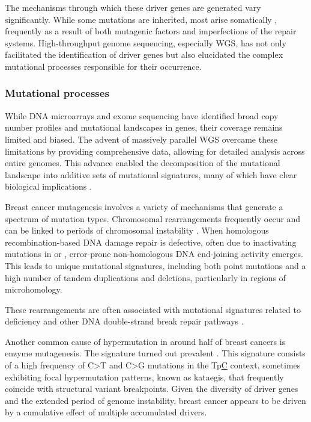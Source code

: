 The mechanisms through which these driver genes are generated vary significantly. While some mutations are inherited, most arise somatically , frequently as a result of both mutagenic factors and imperfections of the repair systems. High-throughput genome sequencing, especially \ac{WGS}, has not only facilitated the identification of driver genes but also elucidated the complex mutational processes responsible for their occurrence.

\subsubsection*{Mutational processes}

While DNA microarrays and exome sequencing have identified broad copy number profiles and mutational landscapes in genes, their coverage remains limited and biased. The advent of massively parallel \ac{WGS} overcame these limitations by providing comprehensive data, allowing for detailed analysis across entire genomes. This advance enabled the decomposition of the mutational landscape into additive sets of mutational signatures, many of which have clear biological implications \parencite{Nik-Zainal2012-vo}. 

Breast cancer mutagenesis involves a variety of mechanisms that generate a spectrum of mutation types. Chromosomal rearrangements frequently occur and can be linked to periods of chromosomal instability \parencite{Curtis2012-hu, Gerstung2020-sg, Nik-Zainal2012-vo}. When homologous recombination-based DNA damage repair is defective, often due to inactivating mutations in  or , error-prone non-homologous DNA end-joining activity emerges. This leads to unique mutational signatures, including both point mutations and a high number of tandem duplications and deletions, particularly in regions of microhomology.

These rearrangements are often associated with mutational signatures related to  deficiency and other DNA double-strand break repair pathways \parencite{Nik-Zainal2012-vo}.


Another common cause of hypermutation in around half of breast cancers is  enzyme mutagenesis. The  signature turned out prevalent \parencite{Nik-Zainal2016-ek, Banerji2012-as, Nik-Zainal2012-vo}. This signature consists of a high frequency of C>T and C>G mutations in the Tp\underline{C} context, sometimes exhibiting focal hypermutation patterns, known as kataegis, that frequently coincide with structural variant breakpoints. Given the diversity of driver genes and the extended period of genome instability, breast cancer appears to be driven by a cumulative effect of multiple accumulated drivers.

